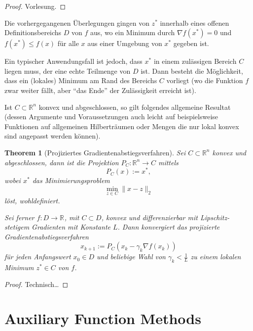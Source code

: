 \documentclass[
]{book}
\newtheorem{theorem}{Theorem}[chapter]
\theoremstyle{definition}
\theoremstyle{definition}
\theoremstyle{definition}
\theoremstyle{definition}
\theoremstyle{remark}
\begin{document}
\begin{proof}
Vorlesung.
\end{proof}

Die vorhergegangenen Überlegungen gingen von \(z^*\) innerhalb eines offenen Definitionsbereichs \(D\) von \(f\) aus, wo ein Minimum durch \(\nabla f(x^*)=0\) und \(f(x^*)\leq f(x)\) für alle \(x\) aus einer Umgebung von \(x^*\) gegeben ist.

Ein typischer Anwendungsfall ist jedoch, dass \(x^*\) in einem zulässigen Bereich \(C\) liegen muss, der eine echte Teilmenge von \(D\) ist.
Dann besteht die Möglichkeit, dass ein (lokales) Minimum am Rand des Bereichs \(C\) vorliegt (wo die Funktion \(f\) zwar weiter fällt, aber ``das Ende'' der Zulässigkeit erreicht ist).

Ist \(C\subset \mathbb R^{n}\) konvex und abgeschlossen, so gilt folgendes allgemeine Resultat (dessen Argumente und Voraussetzungen auch leicht auf beispielsweise Funktionen auf allgemeinen Hilberträumen oder Mengen die nur lokal konvex sind angepasst werden können).

\begin{theorem}[Projiziertes Gradientenabstiegsverfahren]
\protect\hypertarget{thm:thm-prj-grad-desc}{}\label{thm:thm-prj-grad-desc}Sei \(C \subset \mathbb R^{n}\) konvex und abgeschlossen, dann ist die Projektion \(P_C\colon \mathbb R^{n} \to C\) mittels
\begin{equation*}
P_C(x) := x^*,
\end{equation*}
wobei \(x^*\) das Minimierungsproblem
\begin{equation*}
\min_{z\in C} \|x-z\|_2
\end{equation*}
löst, wohldefiniert.

Sei ferner \(f\colon D \to \mathbb R^{}\), mit \(C \subset D\), konvex und differenzierbar mit Lipschitz-stetigem Gradienten mit Konstante \(L\). Dann konvergiert das projizierte Gradientenabstiegsverfahren
\begin{equation}
x_{k+1} := P_C(x_k - \gamma_k\nabla f(x_k))
\label{eq:eqn-prj-grad-desc}
\end{equation}
für jeden Anfangswert \(x_0\in D\) und beliebige Wahl von \(\gamma_k < \frac 1L\) zu einem lokalen Minimum \(z^*\in C\) von \(f\).
\end{theorem}

\begin{proof}
Technisch\ldots{}
\end{proof}

\hypertarget{auxiliary-function-methods}{%
\section{Auxiliary Function Methods}\label{auxiliary-function-methods}}
\end{document}
